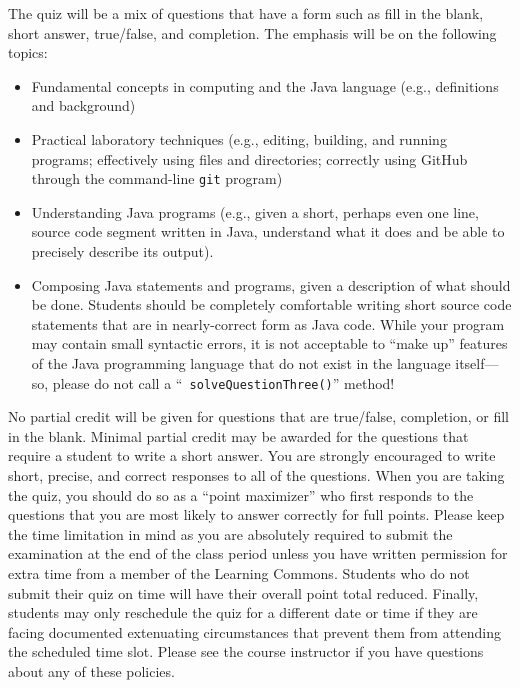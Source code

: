 \documentclass[11pt]{article}
\begin{document}
\noindent The quiz will be a mix of questions that have a form such as fill in
the blank, short answer, true/false, and completion. The emphasis will be on the
following topics:

\vspace*{-.05in}
\begin{itemize}

  \itemsep 0in

  \item Fundamental concepts in computing and the Java language (e.g.,
    definitions and background)

  \item Practical laboratory techniques (e.g., editing, building, and running
    programs; effectively using files and directories; correctly using GitHub
    through the command-line {\tt git} program)

  \item Understanding Java programs (e.g., given a short, perhaps even one line,
    source code segment written in Java, understand what it does and be able to
    precisely describe its output).

  \item Composing Java statements and programs, given a description of what
    should be done. Students should be completely comfortable writing short
    source code statements that are in nearly-correct form as Java code. While
    your program may contain small syntactic errors, it is not acceptable to
    ``make up'' features of the Java programming language that do not exist in
    the language itself---so, please do not call a ``{\tt
    solveQuestionThree()}'' method!

\end{itemize}

\noindent No partial credit will be given for questions that are true/false,
completion, or fill in the blank. Minimal partial credit may be awarded for the
questions that require a student to write a short answer. You are strongly
encouraged to write short, precise, and correct responses to all of the
questions. When you are taking the quiz, you should do so as a ``point
maximizer'' who first responds to the questions that you are most likely to
answer correctly for full points. Please keep the time limitation in mind as you
are absolutely required to submit the examination at the end of the class period
unless you have written permission for extra time from a member of the Learning
Commons. Students who do not submit their quiz on time will have their overall
point total reduced. Finally, students may only reschedule the quiz for a
different date or time if they are facing documented extenuating circumstances
that prevent them from attending the scheduled time slot. Please see the course
instructor if you have questions about any of these policies.
\end{document}
